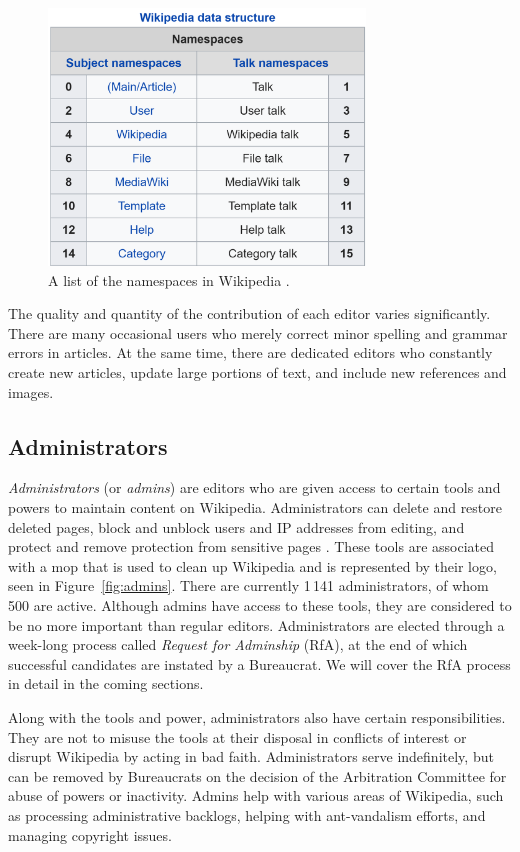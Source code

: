 \begin{figure}[htp]
    \centering
    \includegraphics[width=0.75\textwidth]{images/namespaces.PNG}
    \caption{A list of the namespaces in Wikipedia \cite{wiki:namespace}.}
    \label{fig:namespace}
\end{figure}

The quality and quantity of the contribution of each editor varies significantly. There are many occasional users who merely correct minor spelling and grammar errors in articles. At the same time, there are dedicated editors who constantly create new articles, update large portions of text, and include new references and images.   

\subsection{Administrators}
\textit{Administrators} (or \textit{admins}) are editors who are given access to certain tools and powers to maintain content on Wikipedia. Administrators can delete and restore deleted pages, block and unblock users and IP addresses from editing, and protect and remove protection from sensitive pages \cite{wiki:admins}. These tools are associated with a mop that is used to clean up Wikipedia and is represented by their logo, seen in Figure~\ref{fig:admins}. 
There are currently 1\,141 administrators, of whom 500 are active. Although admins have access to these tools, they are considered to be no more important than regular editors. Administrators are elected through a week-long process called \textit{Request for Adminship} (RfA), at the end of which successful candidates are instated by a Bureaucrat. We will cover the RfA process in detail in the coming sections. 

Along with the tools and power, administrators also have certain responsibilities. They are not to misuse the tools at their disposal in conflicts of interest or disrupt Wikipedia by acting in bad faith. Administrators serve indefinitely, but can be removed  by Bureaucrats on the decision of the Arbitration Committee for abuse of powers or inactivity. Admins help with various areas of Wikipedia, such as processing administrative backlogs, helping with ant-vandalism efforts, and managing copyright issues. 

